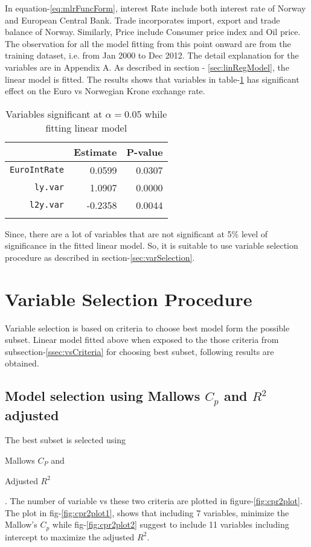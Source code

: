 \documentclass[12pt, lot, lof]{thesis}\usepackage[]{graphicx}\usepackage[]{color}
\begin{document}
In equation-\ref{eq:mlrFuncForm}, interest Rate include both interest rate of Norway and European Central Bank. Trade incorporates import, export and trade balance of Norway. Similarly, Price include Consumer price index and Oil price. The observation for all the model fitting from this point onward are from the training dataset, i.e. from Jan 2000 to Dec 2012. The detail explanation for the variables are in Appendix A. As described in section - \ref{sec:linRegModel}, the linear model is fitted. The results shows that variables in table-\ref{tbl:lmSumry} has significant effect on the Euro vs Norwegian Krone exchange rate.

{\singlespacing
\begin{longtable}{rrr}
\caption{Variables significant at $\alpha=0.05$ while fitting linear model} \\ 
  \hline
 & Estimate & P-value \\ 
  \hline
\texttt{EuroIntRate} & 0.0599 & 0.0307 \\ 
  \texttt{ly.var} & 1.0907 & 0.0000 \\ 
  \texttt{l2y.var} & -0.2358 & 0.0044 \\ 
   \hline
\hline
\label{tbl:lmSumry}
\end{longtable}

}

Since, there are a lot of variables that are not significant at 5\% level of significance in the fitted linear model. So, it is suitable to use variable selection procedure as described in section-\ref{sec:varSelection}.

\section{Variable Selection Procedure}
\label{sec:stepwise}
Variable selection is based on criteria to choose best model form the possible subset. Linear model fitted above when exposed to the those criteria from subsection-\ref{ssec:vsCriteria} for choosing best subset, following results are obtained.

\subsection{Model selection using Mallows $C_p$ and $R^2$ adjusted}
\label{ssec:mcradj}

The best subset is selected using \begin{inlinelist}\item Mallows $C_P$ and \item Adjusted $R^2$ \end{inlinelist}. The number of variable vs these two criteria are plotted in figure-\ref{fig:cpr2plot}. The plot in fig-\ref{fig:cpr2plot1}, shows that including 7 variables, minimize the Mallow's $C_p$ while fig-\ref{fig:cpr2plot2} suggest to include 11 variables including intercept to maximize the adjusted $R^2$.
\end{document}
